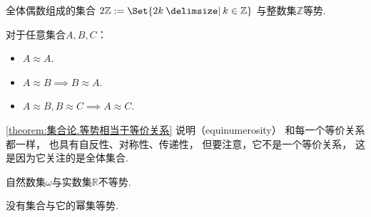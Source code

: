 \begin{example}
全体偶数组成的集合
\(
	2\mathbb{Z}
	\defeq
	\Set{
		2k
		\given
		k \in \mathbb{Z}
	}
\)
与整数集\(\mathbb{Z}\)等势.
\end{example}

\begin{theorem}\label{theorem:集合论.等势相当于等价关系}
对于任意集合\(A,B,C\)：\begin{itemize}
	\item \(A \approx A\).
	\item \(A \approx B \implies B \approx A\).
	\item \(A \approx B, B \approx C \implies A \approx C\).
\end{itemize}
\end{theorem}
\cref{theorem:集合论.等势相当于等价关系}
说明（equinumerosity）
和每一个等价关系都一样，
也具有自反性、对称性、传递性，
但要注意，它不是一个等价关系，
这是因为它关注的是全体集合.

\begin{theorem}
自然数集\(\omega\)与实数集\(\mathbb{R}\)不等势.
\end{theorem}

\begin{theorem}
没有集合与它的幂集等势.
\end{theorem}
